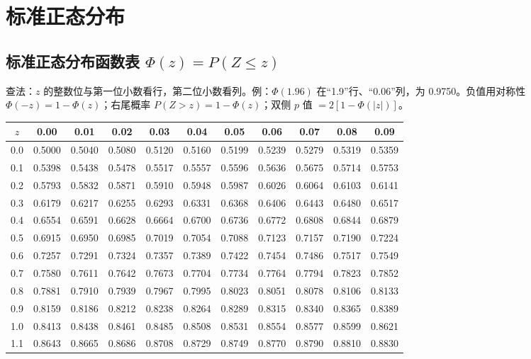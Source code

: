\section{标准正态分布}
\subsection{标准正态分布函数表 \texorpdfstring{$\Phi(z)=P(Z\le z)$}{Phi(z)}}
查法：$z$ 的整数位与第一位小数看行，第二位小数看列。例：$\Phi(1.96)$ 在“1.9”行、“0.06”列，为 0.9750。负值用对称性 $\Phi(-z)=1-\Phi(z)$；右尾概率 $P(Z>z)=1-\Phi(z)$；双侧 $p$ 值 $=2[1-\Phi(|z|)]$。
\begin{center}\footnotesize\setlength{\tabcolsep}{4pt}\renewcommand{\arraystretch}{1.02}
\label{tab:phi}
\begin{tabular}{c|cccccccccc}\toprule
$z$ & 0.00 & 0.01 & 0.02 & 0.03 & 0.04 & 0.05 & 0.06 & 0.07 & 0.08 & 0.09\\\midrule
0.0 & 0.5000 & 0.5040 & 0.5080 & 0.5120 & 0.5160 & 0.5199 & 0.5239 & 0.5279 & 0.5319 & 0.5359\\
0.1 & 0.5398 & 0.5438 & 0.5478 & 0.5517 & 0.5557 & 0.5596 & 0.5636 & 0.5675 & 0.5714 & 0.5753\\
0.2 & 0.5793 & 0.5832 & 0.5871 & 0.5910 & 0.5948 & 0.5987 & 0.6026 & 0.6064 & 0.6103 & 0.6141\\
0.3 & 0.6179 & 0.6217 & 0.6255 & 0.6293 & 0.6331 & 0.6368 & 0.6406 & 0.6443 & 0.6480 & 0.6517\\
0.4 & 0.6554 & 0.6591 & 0.6628 & 0.6664 & 0.6700 & 0.6736 & 0.6772 & 0.6808 & 0.6844 & 0.6879\\
0.5 & 0.6915 & 0.6950 & 0.6985 & 0.7019 & 0.7054 & 0.7088 & 0.7123 & 0.7157 & 0.7190 & 0.7224\\
0.6 & 0.7257 & 0.7291 & 0.7324 & 0.7357 & 0.7389 & 0.7422 & 0.7454 & 0.7486 & 0.7517 & 0.7549\\
0.7 & 0.7580 & 0.7611 & 0.7642 & 0.7673 & 0.7704 & 0.7734 & 0.7764 & 0.7794 & 0.7823 & 0.7852\\
0.8 & 0.7881 & 0.7910 & 0.7939 & 0.7967 & 0.7995 & 0.8023 & 0.8051 & 0.8078 & 0.8106 & 0.8133\\
0.9 & 0.8159 & 0.8186 & 0.8212 & 0.8238 & 0.8264 & 0.8289 & 0.8315 & 0.8340 & 0.8365 & 0.8389\\
1.0 & 0.8413 & 0.8438 & 0.8461 & 0.8485 & 0.8508 & 0.8531 & 0.8554 & 0.8577 & 0.8599 & 0.8621\\
1.1 & 0.8643 & 0.8665 & 0.8686 & 0.8708 & 0.8729 & 0.8749 & 0.8770 & 0.8790 & 0.8810 & 0.8830\\

\end{tabular}
\end{center}
